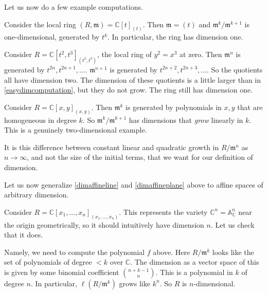 Let us now do a few example computations. 

\begin{example} \label{easydimcomputation}
\label{dimaffineline}
Consider the local ring $(R, \mathfrak{m}) = \mathbb{C}[t]_{(t)}$. Then $\mathfrak{m} = (t)$ and
$\mathfrak{m}^k/\mathfrak{m}^{k+1}$ is one-dimensional, generated by $t^k$. In
particular, the ring has dimension one. 
\end{example} 

\begin{example} Consider $R = \mathbb{C}[t^2, t^3]_{(t^2, t^3)}$, the local ring of $y^2 = x^3$
at zero. Then $\mathfrak{m}^n$ is generated by $t^{2n}, t^{2n+1}, \dots$.
$\mathfrak{m}^{n+1}$ is generated by $t^{2n+2}, t^{2n+3}, \dots$. So the
quotients all have dimension two. The dimension of these quotients is a little
larger than in \cref{easydimcomputation}, but they do not grow. The ring still has dimension one. 
\end{example} 

\begin{example} \label{dimaffineplane}
Consider $R = \mathbb{C}[x,y]_{(x,y)}$. Then $\mathfrak{m}^k$ is generated by
polynomials in $x,y$ that are homogeneous in degree $k$. So $\mathfrak{m}^k/\mathfrak{m}^{k+1}$
has dimensions that \emph{grow} linearly in $k$. This is a genuinely two-dimensional
example. 
\end{example} 

It is this difference between constant linear and quadratic growth in
$R/\mathfrak{m}^n$ as $n \to \infty$, and not the size of the initial terms,
that we want for our definition of dimension.

Let us now generalize \cref{dimaffineline} and \cref{dimaffineplane}
above to affine spaces of arbitrary dimension. 
\begin{example} 
Consider $R = \mathbb{C}[x_1, \dots, x_n]_{(x_1, \dots, x_n)}$. 
This represents the variety $\mathbb{C}^n = \mathbb{A}^n_{\mathbb{C}}$ near the origin geometrically, so
it should intuitively have dimension $n$. Let us check that it does. 

Namely, we need to compute the polynomial $f$ above. Here $R/\mathfrak{m}^k$ looks like the set of
polynomials of degree $<k$ over $\mathbb{C}$. The dimension as a vector space
of this is
given by some binomial coefficient $\binom{n+k-1}{n}$. This is a polynomial in
$k$ of degree $n$. In particular, $\ell(R/\mathfrak{m}^k)$ grows like $k^n$.
So $R$ is $n$-dimensional. 
\end{example} 


